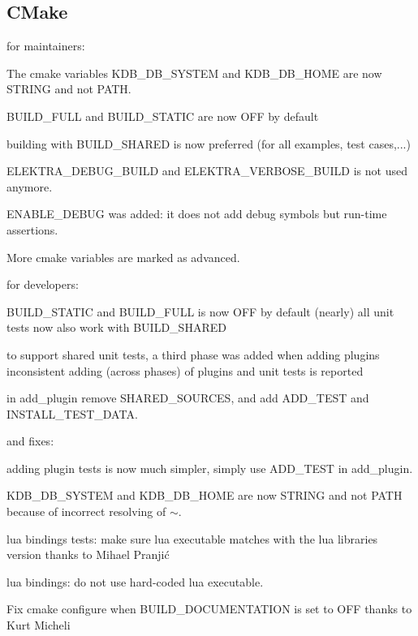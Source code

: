 \subsection*{C\+Make}

for maintainers\+:


\begin{DoxyItemize}
\item The cmake variables K\+D\+B\+\_\+\+D\+B\+\_\+\+S\+Y\+S\+T\+E\+M and K\+D\+B\+\_\+\+D\+B\+\_\+\+H\+O\+M\+E are now S\+T\+R\+I\+N\+G and not P\+A\+T\+H.
\item B\+U\+I\+L\+D\+\_\+\+F\+U\+L\+L and B\+U\+I\+L\+D\+\_\+\+S\+T\+A\+T\+I\+C are now O\+F\+F by default
\item building with B\+U\+I\+L\+D\+\_\+\+S\+H\+A\+R\+E\+D is now preferred (for all examples, test cases,...)
\item E\+L\+E\+K\+T\+R\+A\+\_\+\+D\+E\+B\+U\+G\+\_\+\+B\+U\+I\+L\+D and E\+L\+E\+K\+T\+R\+A\+\_\+\+V\+E\+R\+B\+O\+S\+E\+\_\+\+B\+U\+I\+L\+D is not used anymore.
\item E\+N\+A\+B\+L\+E\+\_\+\+D\+E\+B\+U\+G was added\+: it does not add debug symbols but run-\/time assertions.
\item More cmake variables are marked as advanced.
\end{DoxyItemize}

for developers\+:


\begin{DoxyItemize}
\item B\+U\+I\+L\+D\+\_\+\+S\+T\+A\+T\+I\+C and B\+U\+I\+L\+D\+\_\+\+F\+U\+L\+L is now O\+F\+F by default (nearly) all unit tests now also work with B\+U\+I\+L\+D\+\_\+\+S\+H\+A\+R\+E\+D
\item to support shared unit tests, a third phase was added when adding plugins inconsistent adding (across phases) of plugins and unit tests is reported
\item in {\ttfamily add\+\_\+plugin} remove S\+H\+A\+R\+E\+D\+\_\+\+S\+O\+U\+R\+C\+E\+S, and add {\ttfamily A\+D\+D\+\_\+\+T\+E\+S\+T} and {\ttfamily I\+N\+S\+T\+A\+L\+L\+\_\+\+T\+E\+S\+T\+\_\+\+D\+A\+T\+A}.
\end{DoxyItemize}

and fixes\+:


\begin{DoxyItemize}
\item adding plugin tests is now much simpler, simply use {\ttfamily A\+D\+D\+\_\+\+T\+E\+S\+T} in {\ttfamily add\+\_\+plugin}.
\item K\+D\+B\+\_\+\+D\+B\+\_\+\+S\+Y\+S\+T\+E\+M and K\+D\+B\+\_\+\+D\+B\+\_\+\+H\+O\+M\+E are now S\+T\+R\+I\+N\+G and not P\+A\+T\+H because of incorrect resolving of {\ttfamily $\sim$}.
\item lua bindings tests\+: make sure lua executable matches with the lua libraries version thanks to Mihael Pranjić
\item lua bindings\+: do not use hard-\/coded {\ttfamily lua} executable.
\item Fix cmake configure when B\+U\+I\+L\+D\+\_\+\+D\+O\+C\+U\+M\+E\+N\+T\+A\+T\+I\+O\+N is set to O\+F\+F thanks to Kurt Micheli
\end{DoxyItemize}

